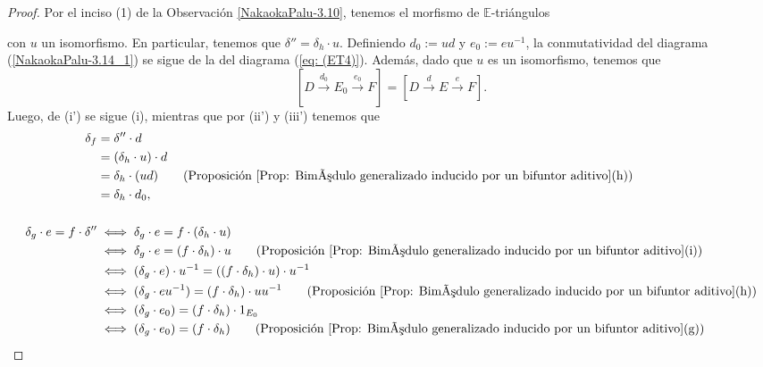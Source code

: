 \documentclass[tesis]{subfiles}
\begin{document}
\begin{proof}
    Por el inciso (1) de la Observación \ref{NakaokaPalu-3.10}, tenemos el morfismo de $\mathbb{E}$-triángulos
    \begin{center}
    \end{center}
    con $u$ un isomorfismo. En particular, tenemos que $\delta'' = \delta_h\cdot u$. Definiendo $d_0:=ud$ y $e_0:=eu^{-1}$,  la conmutatividad del diagrama (\ref{NakaokaPalu-3.14_1}) se sigue de la del diagrama (\ref{eq: (ET4)}). Además, dado que $u$ es un isomorfismo, tenemos que
    \[
    [D\xrightarrow[]{d_0}E_0\xrightarrow[]{e_0}F] = [D\xrightarrow[]{d}E\xrightarrow[]{e}F].
    \] 
    Luego, de (i') se sigue (i), mientras que por (ii') y (iii') tenemos que
    \begin{align*}
        \delta_f &= \delta''\cdot d \\
                 &= (\delta_h\cdot u)\cdot d \\
                 &= \delta_h\cdot(ud) \tag{Proposición \ref{Prop: Bimódulo generalizado inducido por un bifuntor aditivo}(h)} \\
                 &= \delta_h\cdot d_0, \\ \\
        \delta_g\cdot e = f\cdot\delta'' &\iff \delta_g\cdot e = f\cdot(\delta_h\cdot u) \\
                                         &\iff \delta_g\cdot e =  (f\cdot \delta_h)\cdot u \tag{Proposición \ref{Prop: Bimódulo generalizado inducido por un bifuntor aditivo}(i)} \\
                                         &\iff (\delta_g\cdot e)\cdot u^{-1} = ((f\cdot\delta_h)\cdot u)\cdot u^{-1} \\
                                         &\iff (\delta_g\cdot eu^{-1}) = (f\cdot\delta_h)\cdot uu^{-1} \tag{Proposición \ref{Prop: Bimódulo generalizado inducido por un bifuntor aditivo}(h)} \\
                                         &\iff (\delta_g\cdot e_0) = (f\cdot\delta_h)\cdot 1_{E_0} \\
                                         &\iff (\delta_g\cdot e_0) = (f\cdot\delta_h) \tag{Proposición \ref{Prop: Bimódulo generalizado inducido por un bifuntor aditivo}(g)} \\
    \end{align*}
\end{proof}
\end{document}
